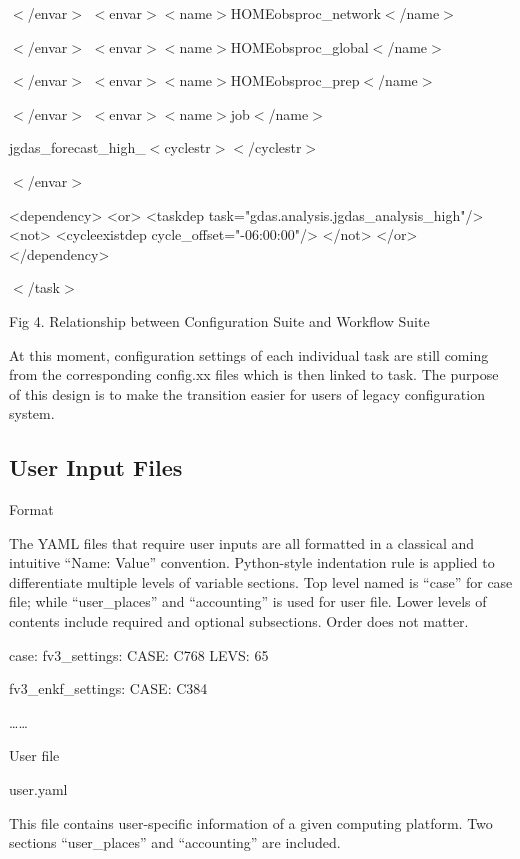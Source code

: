 $<$/envar$>$ $<$envar$>$$<$name$>$H\-O\-M\-Eobsproc\-\_\-network$<$/name$>$

$<$/envar$>$ $<$envar$>$$<$name$>$H\-O\-M\-Eobsproc\-\_\-global$<$/name$>$

$<$/envar$>$ $<$envar$>$$<$name$>$H\-O\-M\-Eobsproc\-\_\-prep$<$/name$>$

$<$/envar$>$ $<$envar$>$$<$name$>$job$<$/name$>$

jgdas\-\_\-forecast\-\_\-high\-\_\-$<$cyclestr$>$$<$/cyclestr$>$

$<$/envar$>$

\begin{DoxyVerb}    <dependency>
          <or>
                <taskdep task="gdas.analysis.jgdas_analysis_high"/>
                <not>
                      <cycleexistdep cycle_offset="-06:00:00"/>
                </not>
          </or>
    </dependency>
\end{DoxyVerb}
 $<$/task$>$

Fig 4. Relationship between Configuration Suite and Workflow Suite

At this moment, configuration settings of each individual task are still coming from the corresponding config.\-xx files which is then linked to task. The purpose of this design is to make the transition easier for users of legacy configuration system.

\subsection*{User Input Files }

Format

The Y\-A\-M\-L files that require user inputs are all formatted in a classical and intuitive “\-Name\-: Value” convention. Python-\/style indentation rule is applied to differentiate multiple levels of variable sections. Top level named is “case” for case file; while “user\-\_\-places” and “accounting” is used for user file. Lower levels of contents include required and optional subsections. Order does not matter.

case\-: fv3\-\_\-settings\-: C\-A\-S\-E\-: C768 L\-E\-V\-S\-: 65

fv3\-\_\-enkf\-\_\-settings\-: C\-A\-S\-E\-: C384

……

User file

user.\-yaml

This file contains user-\/specific information of a given computing platform. Two sections “user\-\_\-places” and “accounting” are included.

